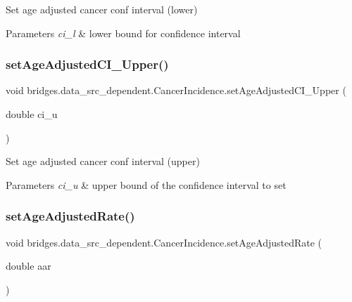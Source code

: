 Set age adjusted cancer conf interval (lower) 


\begin{DoxyParams}{Parameters}
{\em ci\+\_\+l} & lower bound for confidence interval \\
\hline
\end{DoxyParams}
\mbox{\label{classbridges_1_1data__src__dependent_1_1_cancer_incidence_aeb386486bfbd96ba9ab689b7d95d4522}} 
\subsubsection{\texorpdfstring{setAgeAdjustedCI\_Upper()}{setAgeAdjustedCI\_Upper()}}
{\footnotesize\ttfamily void bridges.\+data\+\_\+src\+\_\+dependent.\+Cancer\+Incidence.\+set\+Age\+Adjusted\+C\+I\+\_\+\+Upper (\begin{DoxyParamCaption}\item[{double}]{ci\+\_\+u }\end{DoxyParamCaption})}



Set age adjusted cancer conf interval (upper) 


\begin{DoxyParams}{Parameters}
{\em ci\+\_\+u} & upper bound of the confidence interval to set \\
\hline
\end{DoxyParams}
\mbox{\label{classbridges_1_1data__src__dependent_1_1_cancer_incidence_a26c2d63e8465bcfdab047129312b4897}} 
\subsubsection{\texorpdfstring{setAgeAdjustedRate()}{setAgeAdjustedRate()}}
{\footnotesize\ttfamily void bridges.\+data\+\_\+src\+\_\+dependent.\+Cancer\+Incidence.\+set\+Age\+Adjusted\+Rate (\begin{DoxyParamCaption}\item[{double}]{aar }\end{DoxyParamCaption})}



